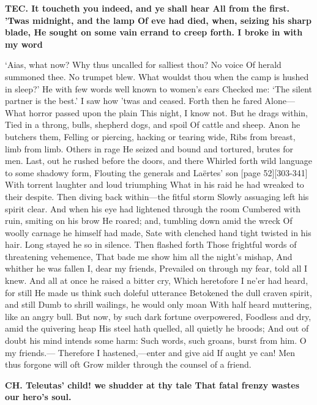 \documentclass[11pt,letter]{book}
\begin{document}
\par \textbf{TEC. It toucheth you indeed, and ye shall hear All from the first. ’Twas midnight, and the lamp Of eve had died, when, seizing his sharp blade, He sought on some vain errand to creep forth. I broke in with my word}
\par   ‘Aias, what now? Why thus uncalled for salliest thou? No voice Of herald summoned thee. No trumpet blew. What wouldst thou when the camp is hushed in sleep?’ He with few words well known to women’s ears Checked me:  ‘The silent partner is the best.’ I saw how ’twas and ceased. Forth then he fared Alone—What horror passed upon the plain This night, I know not. But he drags within, Tied in a throng, bulls, shepherd dogs, and spoil Of cattle and sheep. Anon he butchers them, Felling or piercing, hacking or tearing wide, Ribs from breast, limb from limb. Others in rage He seized and bound and tortured, brutes for men. Last, out he rushed before the doors, and there Whirled forth wild language to some shadowy form, Flouting the generals and Laërtes’ son [page 52][303-341] With torrent laughter and loud triumphing What in his raid he had wreaked to their despite. Then diving back within—the fitful storm Slowly assuaging left his spirit clear. And when his eye had lightened through the room Cumbered with ruin, smiting on his brow He roared; and, tumbling down amid the wreck Of woolly carnage he himself had made, Sate with clenched hand tight twisted in his hair. Long stayed he so in silence. Then flashed forth Those frightful words of threatening vehemence, That bade me show him all the night’s mishap, And whither he was fallen I, dear my friends, Prevailed on through my fear, told all I knew. And all at once he raised a bitter cry, Which heretofore I ne’er had heard, for still He made us think such doleful utterance Betokened the dull craven spirit, and still Dumb to shrill wailings, he would only moan With half heard muttering, like an angry bull. But now, by such dark fortune overpowered, Foodless and dry, amid the quivering heap His steel hath quelled, all quietly he broods; And out of doubt his mind intends some harm:  Such words, such groans, burst from him. O my friends.— Therefore I hastened,—enter and give aid If aught ye can! Men thus forgone will oft Grow milder through the counsel of a friend.

\par \textbf{CH. Teleutas’ child! we shudder at thy tale That fatal frenzy wastes our hero’s soul.}
\par 
\end{document}
